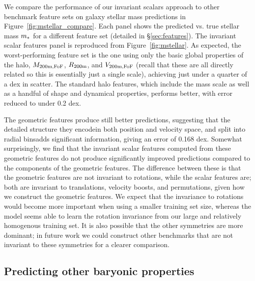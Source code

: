 We compare the performance of our invariant scalars approach to other benchmark feature sets on galaxy stellar mass predictions in Figure~\ref{fig:mstellar_compare}.
Each panel shows the predicted vs. true stellar mass $m_*$ for a different feature set (detailed in \S\ref{sec:features}).
The invariant scalar features panel is reproduced from Figure~\ref{fig:mstellar}.
As expected, the worst-performing feature set is the one using only the basic global properties of the halo, $M_\mathrm{200m,FoF}$, $R_\mathrm{200m}$, and $V_\mathrm{200m,FoF}$ (recall that these are all directly related so this is essentially just a single scale), achieving just under a quarter of a dex in scatter.
The standard halo features, which include the mass scale as well as a handful of shape and dynamical properties, performs better, with error reduced to under 0.2 dex. 

The geometric features produce still better predictions, suggesting that the detailed structure they encode{\emdash}in both position and velocity space, and split into radial bins{\emdash}adds significant information, giving an error of 0.168 dex.
Somewhat surprisingly, we find that the invariant scalar features computed from these geometric features do not produce significantly improved predictions compared to the components of the geometric features.
The difference between these is that the geometric features are not invariant to rotations, while the scalar features are; both are invariant to translations, velocity boosts, and permutations, given how we construct the geometric features.
We expect that the invariance to rotations would become more important when using a smaller training set size, whereas the model seems able to learn the rotation invariance from our large and relatively homogenous training set.
It is also possible that the other symmetries are more dominant; in future work we could construct other benchmarks that are not invariant to these symmetries for a clearer comparison.


\subsection{Predicting other baryonic properties}
\label{sec:pred_galprops}

